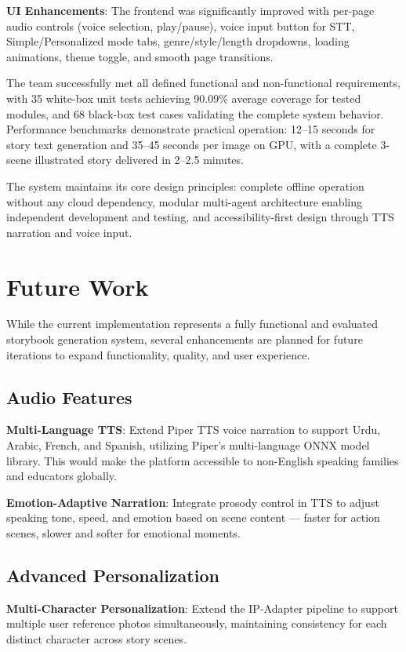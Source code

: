 \textbf{UI Enhancements}: The frontend was significantly improved with per-page audio controls (voice selection, play/pause), voice input button for STT, Simple/Personalized mode tabs, genre/style/length dropdowns, loading animations, theme toggle, and smooth page transitions.

The team successfully met all defined functional and non-functional requirements, with 35 white-box unit tests achieving 90.09\% average coverage for tested modules, and 68 black-box test cases validating the complete system behavior. Performance benchmarks demonstrate practical operation: 12--15 seconds for story text generation and 35--45 seconds per image on GPU, with a complete 3-scene illustrated story delivered in 2--2.5 minutes.

The system maintains its core design principles: complete offline operation without any cloud dependency, modular multi-agent architecture enabling independent development and testing, and accessibility-first design through TTS narration and voice input.


\section{Future Work}

While the current implementation represents a fully functional and evaluated storybook generation system, several enhancements are planned for future iterations to expand functionality, quality, and user experience.

\subsection{Audio Features}

\textbf{Multi-Language TTS}: Extend Piper TTS voice narration to support Urdu, Arabic, French, and Spanish, utilizing Piper's multi-language ONNX model library. This would make the platform accessible to non-English speaking families and educators globally.

\textbf{Emotion-Adaptive Narration}: Integrate prosody control in TTS to adjust speaking tone, speed, and emotion based on scene content — faster for action scenes, slower and softer for emotional moments.

\subsection{Advanced Personalization}

\textbf{Multi-Character Personalization}: Extend the IP-Adapter pipeline to support multiple user reference photos simultaneously, maintaining consistency for each distinct character across story scenes.

